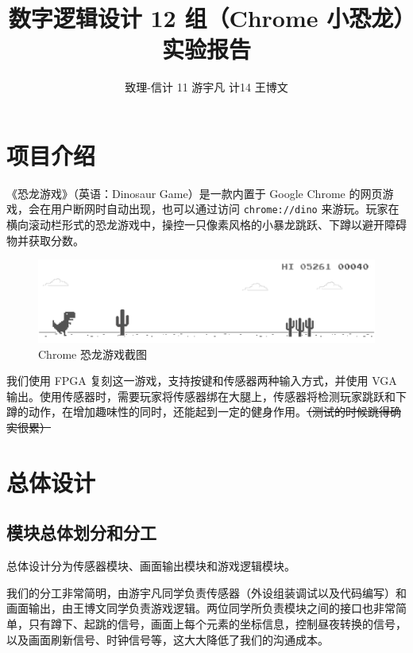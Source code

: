 \documentclass[UTF8, 11pt, fontset=none]{ctexart}
\begin{document}
\title{数字逻辑设计 12 组（Chrome 小恐龙）实验报告}
\author{致理-信计 11 \hspace{2pt} 游宇凡 \hspace{12pt} 计14 \hspace{2pt} 王博文}
\maketitle

\section{项目介绍}

《恐龙游戏》（英语：Dinosaur Game）是一款内置于 Google Chrome 的网页游戏，会在用户断网时自动出现，也可以通过访问 \texttt{chrome://dino} 来游玩。玩家在横向滚动栏形式的恐龙游戏中，操控一只像素风格的小暴龙跳跃、下蹲以避开障碍物并获取分数。

\begin{figure}[H]
    \centering
    \includegraphics[width=\textwidth]{images/cover.png}
    \caption{Chrome 恐龙游戏截图}
    \label{cover}
\end{figure}

我们使用 FPGA 复刻这一游戏，支持按键和传感器两种输入方式，并使用 VGA 输出。使用传感器时，需要玩家将传感器绑在大腿上，传感器将检测玩家跳跃和下蹲的动作，在增加趣味性的同时，还能起到一定的健身作用。\scriptsize\sout{（测试的时候跳得确实很累）}\normalsize

\section{总体设计}

\subsection{模块总体划分和分工}

总体设计分为传感器模块、画面输出模块和游戏逻辑模块。

我们的分工非常简明，由游宇凡同学负责传感器（外设组装调试以及代码编写）和画面输出，由王博文同学负责游戏逻辑。两位同学所负责模块之间的接口也非常简单，只有蹲下、起跳的信号，画面上每个元素的坐标信息，控制昼夜转换的信号，以及画面刷新信号、时钟信号等，这大大降低了我们的沟通成本。
\end{document}
